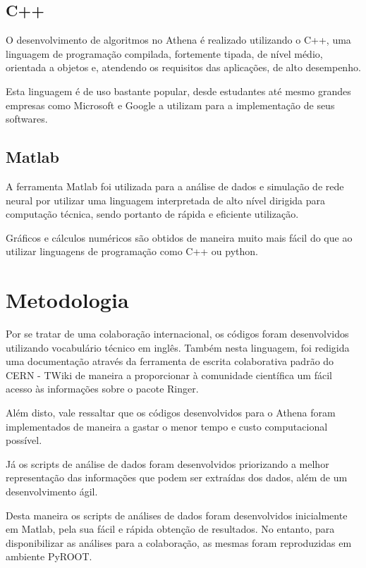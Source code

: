 \documentclass[a4paper,10pt,titlepage]{article}
\begin{document}
\subsection{C++}

O desenvolvimento de algoritmos no Athena é realizado utilizando o C++, uma linguagem de programação compilada, fortemente tipada, de nível médio, orientada a objetos e, atendendo os requisitos das aplicações, de alto desempenho.

Esta linguagem é de uso bastante popular, desde estudantes até mesmo grandes empresas como Microsoft e Google a utilizam para a implementação de seus softwares.

\subsection{Matlab}

A ferramenta Matlab foi utilizada para a análise de dados e simulação de rede neural por utilizar uma linguagem interpretada de alto nível dirigida para computação técnica, sendo portanto de rápida e eficiente utilização.

Gráficos e cálculos numéricos são obtidos de maneira muito mais fácil do que ao utilizar linguagens de programação como C++ ou python.

\clearpage

\section{Metodologia}

Por se tratar de uma colaboração internacional, os códigos foram desenvolvidos utilizando vocabulário técnico em inglês.
Também nesta linguagem, foi redigida uma documentação através da ferramenta de escrita colaborativa padrão do CERN - TWiki de maneira a proporcionar à comunidade científica um fácil acesso às informações sobre o pacote Ringer.

Além disto, vale ressaltar que os códigos desenvolvidos para o Athena foram implementados de maneira a gastar o menor tempo e custo computacional possível.

Já os scripts de análise de dados foram desenvolvidos priorizando a melhor representação das informações que podem ser extraídas dos dados, além de um desenvolvimento ágil.

Desta maneira os scripts de análises de dados foram desenvolvidos inicialmente em Matlab, pela sua fácil e rápida obtenção de resultados.
No entanto, para disponibilizar as análises para a colaboração, as mesmas foram reproduzidas em ambiente PyROOT.
\end{document}
